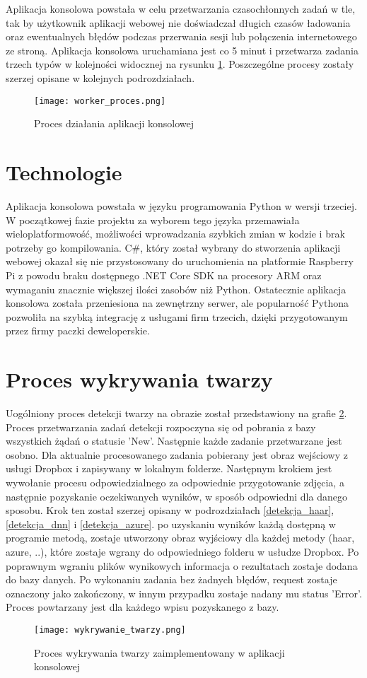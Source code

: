 Aplikacja konsolowa powstała w celu przetwarzania czasochłonnych zadań w tle, tak by użytkownik aplikacji webowej nie doświadczał długich czasów ładowania oraz ewentualnych błędów podczas przerwania sesji lub połączenia internetowego ze stroną. Aplikacja konsolowa uruchamiana jest co 5 minut i przetwarza zadania trzech typów w kolejności widocznej na rysunku \ref{fig:worker_proces}. Poszczególne procesy zostały szerzej opisane w kolejnych podrozdziałach.
\begin{figure}[H]
	\centering
	\texttt{[image: worker\_proces.png]}
	\caption{Proces działania aplikacji konsolowej}
	\label{fig:worker_proces}
\end{figure}

\section{Technologie}
Aplikacja konsolowa powstała w języku programowania Python w wersji trzeciej. W początkowej fazie projektu za wyborem tego języka przemawiała wieloplatformowość, możliwości wprowadzania szybkich zmian w kodzie i brak potrzeby go kompilowania. C\#, który został wybrany do stworzenia aplikacji webowej okazał się nie przystosowany do uruchomienia na platformie Raspberry Pi z powodu braku dostępnego .NET Core SDK na procesory ARM oraz wymaganiu znacznie większej ilości zasobów niż Python. Ostatecznie aplikacja konsolowa została przeniesiona na zewnętrzny serwer, ale popularność Pythona pozwoliła na szybką integrację z usługami firm trzecich, dzięki przygotowanym przez firmy paczki deweloperskie.

\section{Proces wykrywania twarzy}
Uogólniony proces detekcji twarzy na obrazie został przedstawiony na grafie \ref{fig:wykrywanie_proces}.
Proces przetwarzania zadań detekcji rozpoczyna się od pobrania z bazy wszystkich żądań o statusie 'New'. Następnie każde zadanie przetwarzane jest osobno. Dla aktualnie procesowanego zadania pobierany jest obraz wejściowy z usługi Dropbox i zapisywany w lokalnym folderze. Następnym krokiem jest wywołanie procesu odpowiedzialnego za odpowiednie przygotowanie zdjęcia, a następnie pozyskanie oczekiwanych wyników, w sposób odpowiedni dla danego sposobu. Krok ten został szerzej opisany w podrozdziałach \ref{detekcja_haar}, \ref{detekcja_dnn} i \ref{detekcja_azure}. po uzyskaniu wyników każdą dostępną w programie metodą, zostaje utworzony obraz wyjściowy dla każdej metody (haar, azure, ..), które zostaje wgrany do odpowiedniego folderu w usłudze Dropbox. Po poprawnym wgraniu plików wynikowych informacja o rezultatach zostaje dodana do bazy danych. Po wykonaniu zadania bez żadnych błędów, request zostaje oznaczony jako zakończony, w innym przypadku zostaje nadany mu status 'Error'. Proces powtarzany jest dla każdego wpisu pozyskanego z bazy.
\begin{figure}[H]
	\centering
	\texttt{[image: wykrywanie\_twarzy.png]}
	\caption{Proces wykrywania twarzy zaimplementowany w aplikacji konsolowej}
	\label{fig:wykrywanie_proces}
\end{figure}

